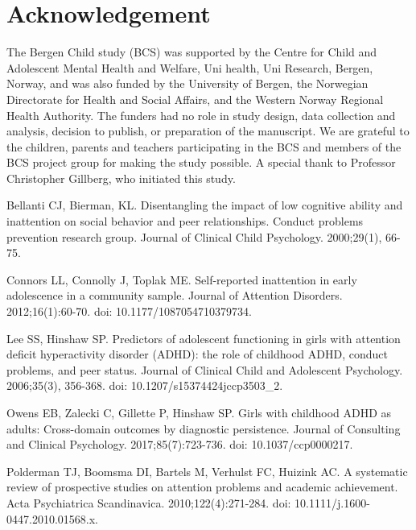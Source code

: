 \documentclass[10pt,letterpaper]{article}
\begin{document}
{\section*{Acknowledgement}
The Bergen Child study (BCS) was supported by the Centre for Child and Adolescent Mental Health and Welfare, Uni health, Uni
Research, Bergen, Norway, and was also funded by the University of Bergen, the Norwegian Directorate for Health and
Social Affairs, and the Western Norway Regional Health Authority. The funders had no role in study design, data collection and analysis, decision to publish, or preparation of the manuscript.
We are grateful to the children, parents and teachers
participating in the BCS and members of the BCS project group for making the study possible. A
special thank to Professor Christopher Gillberg, who initiated this study. 
\newpage


\begin{thebibliography}{vancouver.bst}

Bellanti CJ, Bierman, KL.
\newblock Disentangling the impact of low cognitive ability and inattention on
  social behavior and peer relationships. Conduct problems prevention research
  group.
\newblock Journal of Clinical Child Psychology. 2000;29(1), 66-75.

Connors LL, Connolly J, Toplak ME.
\newblock Self-reported inattention in early adolescence in a community sample.
\newblock Journal of Attention Disorders.  2012;16(1):60-70. doi: 10.1177/1087054710379734.

Lee SS, Hinshaw SP.
\newblock Predictors of adolescent functioning in girls with attention deficit
  hyperactivity disorder ({ADHD}): the role of childhood {ADHD}, conduct
  problems, and peer status.
\newblock Journal of Clinical Child and Adolescent Psychology. 2006;35(3), 356-368. doi: 10.1207/s15374424jccp3503\_2.


Owens EB, Zalecki C, Gillette P, Hinshaw SP.
\newblock Girls with childhood ADHD as adults: Cross-domain outcomes by
  diagnostic persistence.
\newblock Journal of Consulting and Clinical Psychology. 2017;85(7):723-736. doi: 10.1037/ccp0000217.


Polderman TJ, Boomsma DI, Bartels M, Verhulst FC, Huizink AC.
\newblock A systematic review of prospective studies on attention problems and
  academic achievement.
\newblock Acta Psychiatrica Scandinavica. 2010;122(4):271-284. doi: 10.1111/j.1600-0447.2010.01568.x.



\end{thebibliography}}
\end{document}
